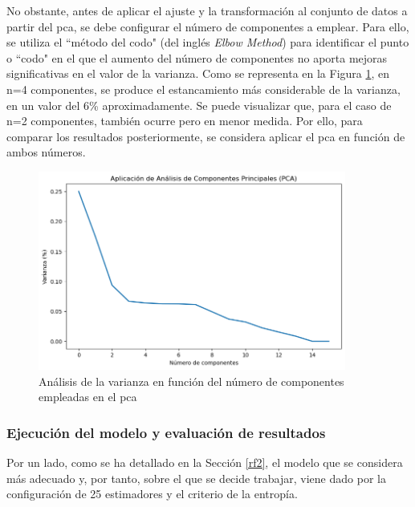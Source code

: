 \vspace{3mm}

No obstante, antes de aplicar el ajuste y la transformación al conjunto de datos a partir del \gls{pca}, se debe configurar el número de componentes a emplear. Para ello, se utiliza el ``método del codo" (del inglés \textit{Elbow Method}) para identificar el punto o ``codo" en el que el aumento del número de componentes no aporta mejoras significativas en el valor de la varianza. Como se representa en la Figura \ref{fig:pca}, en n=4 componentes, se produce el estancamiento más considerable de la varianza, en un valor del 6\% aproximadamente. Se puede visualizar que, para el caso de n=2 componentes, también ocurre pero en menor medida. Por ello, para comparar los resultados posteriormente, se considera aplicar el \gls{pca} en función de ambos números.

\vspace{3mm}

\begin{figure}[H]
  \centering
  \includegraphics[width=0.9\textwidth]{img/desarrollo/pca.png}
  \caption{Análisis de la varianza en función del número de componentes empleadas en el \acrshort{pca}}
  \label{fig:pca}
\end{figure}


\subsubsection{Ejecución del modelo y evaluación de resultados}
\label{sec:rf4}

Por un lado, como se ha detallado en la Sección \ref{rf2}, el modelo que se considera más adecuado y, por tanto, sobre el que se decide trabajar, viene dado por la configuración de 25 estimadores y el criterio de la entropía.

